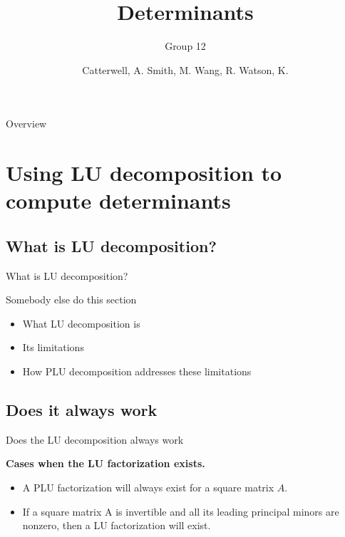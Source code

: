 \documentclass{beamer}
\title{Determinants}
\subtitle{Group 12}
\author{Catterwell, A. \quad Smith, M. \quad Wang, R. \quad Watson, K.}
\institute{University of Edinburgh}
\begin{document}
\begin{frame}
    \maketitle
\end{frame}

\begin{frame}{Overview}
    \tableofcontents
\end{frame}

\section{Using LU decomposition to compute determinants}

\subsection{What is LU decomposition?}

\begin{frame}{What is LU decomposition?}

    Somebody else do this section

    \begin{itemize}
        \item What LU decomposition is
        \item Its limitations
        \item How PLU decomposition addresses these limitations
    \end{itemize}
 \end{frame}

\subsection{Does it always work}

\begin{frame}{Does the LU decomposition always work}

    \textbf{Cases when the LU factorization exists.}

    \begin{itemize}
        \item A PLU factorization will always exist for a square matrix $A$.
        \item If a square matrix A is invertible and all its leading principal minors are nonzero,
            then a LU factorization will exist.
    \end{itemize}


\end{frame}
\end{document}
